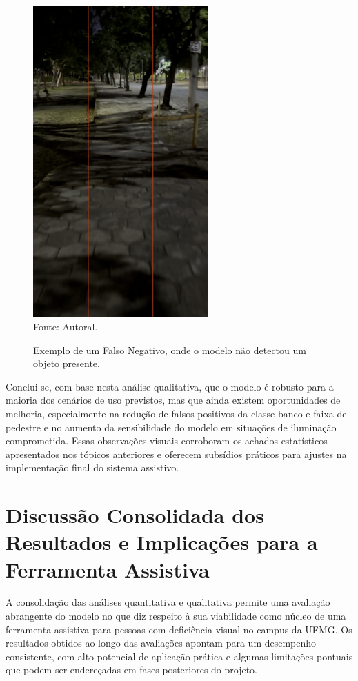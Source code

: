 \begin{figure}[htbp]
  \centering
  \caption{Exemplo de um Falso Negativo, onde o modelo não detectou um objeto presente.}
  \includegraphics[width=0.6\textwidth]{Figuras/falso_negativo.png}
  \\
  Fonte: Autoral.
  \label{fg-falso_negativo}
\end{figure}

Conclui-se, com base nesta análise qualitativa, que o modelo é robusto para a maioria dos cenários de uso previstos, mas que ainda existem oportunidades de melhoria, especialmente na redução de falsos positivos da classe banco e faixa de pedestre e no aumento da sensibilidade do modelo em situações de iluminação comprometida. Essas observações visuais corroboram os achados estatísticos apresentados nos tópicos anteriores e oferecem subsídios práticos para ajustes na implementação final do sistema assistivo.

\section{Discussão Consolidada dos Resultados e Implicações para a Ferramenta Assistiva}

A consolidação das análises quantitativa e qualitativa permite uma avaliação abrangente do modelo no que diz respeito à sua viabilidade como núcleo de uma ferramenta assistiva para pessoas com deficiência visual no campus da UFMG. Os resultados obtidos ao longo das avaliações apontam para um desempenho consistente, com alto potencial de aplicação prática e algumas limitações pontuais que podem ser endereçadas em fases posteriores do projeto.

